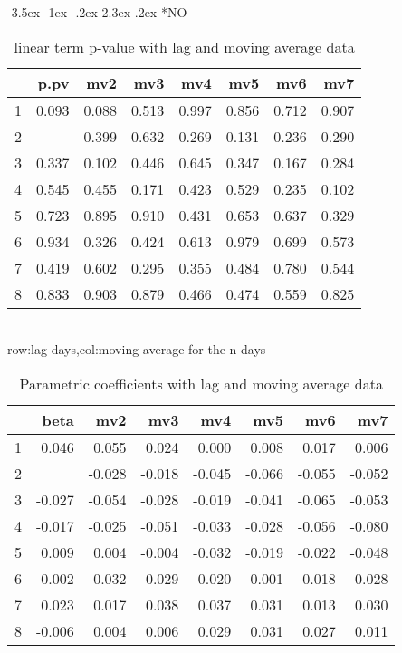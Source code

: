 \documentclass[a4paper, 12pt]{article}
\makeatletter
\def\large{\fontsize{14}{20}\selectfont}
\renewcommand\subsection{\@startsection {subsection}{1}{\z@}%
                                   {-3.5ex \@plus -1ex \@minus -.2ex}%
                                   {2.3ex \@plus.2ex}%
                                   {\centering\normalfont\large\bfseries}}
\makeatother
\begin{document}
\subsection*{NO}
\begin{table}[h]
\centering
\caption{linear term p-value with lag and moving average data}
\begin{tabular}{rrrrrrrr}
  \hline
 & p.pv & mv2 & mv3 & mv4 & mv5 & mv6 & mv7 \\
  \hline
1 & 0.093 & 0.088 & 0.513 & 0.997 & 0.856 & 0.712 & 0.907 \\
  2 & \color{red}{0.025} & 0.399 & 0.632 & 0.269 & 0.131 & 0.236 & 0.290 \\
  3 & 0.337 & 0.102 & 0.446 & 0.645 & 0.347 & 0.167 & 0.284 \\
  4 & 0.545 & 0.455 & 0.171 & 0.423 & 0.529 & 0.235 & 0.102 \\
  5 & 0.723 & 0.895 & 0.910 & 0.431 & 0.653 & 0.637 & 0.329 \\
  6 & 0.934 & 0.326 & 0.424 & 0.613 & 0.979 & 0.699 & 0.573 \\
  7 & 0.419 & 0.602 & 0.295 & 0.355 & 0.484 & 0.780 & 0.544 \\
  8 & 0.833 & 0.903 & 0.879 & 0.466 & 0.474 & 0.559 & 0.825 \\
   \hline
\end{tabular}
\\row:lag days,col:moving average for the n days
\end{table}

\begin{table}[h]
\centering
\caption{Parametric coefficients with lag and moving average data}
\begin{tabular}{rrrrrrrr}
  \hline
 & beta & mv2 & mv3 & mv4 & mv5 & mv6 & mv7 \\
  \hline
1 & 0.046 & 0.055 & 0.024 & 0.000 & 0.008 & 0.017 & 0.006 \\
  2 & \color{red}{-0.064} & -0.028 & -0.018 & -0.045 & -0.066 & -0.055 & -0.052 \\
  3 & -0.027 & -0.054 & -0.028 & -0.019 & -0.041 & -0.065 & -0.053 \\
  4 & -0.017 & -0.025 & -0.051 & -0.033 & -0.028 & -0.056 & -0.080 \\
  5 & 0.009 & 0.004 & -0.004 & -0.032 & -0.019 & -0.022 & -0.048 \\
  6 & 0.002 & 0.032 & 0.029 & 0.020 & -0.001 & 0.018 & 0.028 \\
  7 & 0.023 & 0.017 & 0.038 & 0.037 & 0.031 & 0.013 & 0.030 \\
  8 & -0.006 & 0.004 & 0.006 & 0.029 & 0.031 & 0.027 & 0.011 \\
   \hline
\end{tabular}
\end{table}
\clearpage
\end{document}
